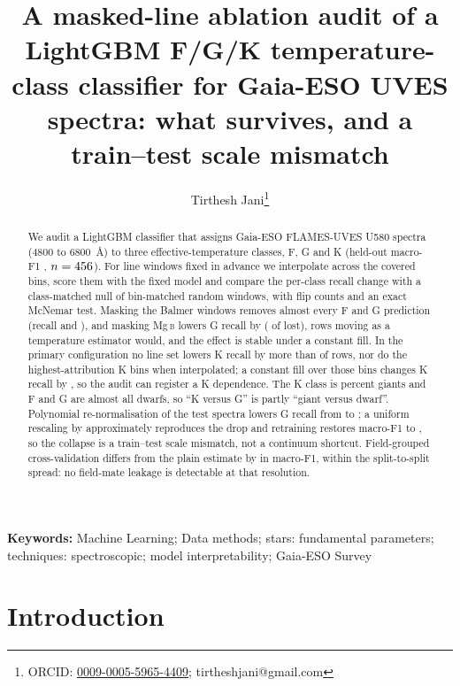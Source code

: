 \documentclass[11pt,a4paper]{article}
\title{A masked-line ablation audit of a LightGBM F/G/K temperature-class classifier for Gaia-ESO UVES spectra: what survives, and a train--test scale mismatch}
\author[1]{Tirthesh Jani\thanks{ORCID: \href{https://orcid.org/0009-0005-5965-4409}{0009-0005-5965-4409}; tirtheshjani@gmail.com}}
\affil[1]{Department of Computer Science, Lakehead University, 5 Ross Street, Barrie, ON L4M 3A5, Canada}
\date{}  %
\newcommand{\Mgb}{Mg\,\textsc{b}\xspace}
\begin{document}
\maketitle

\begin{abstract}
\noindent We audit a LightGBM classifier that assigns Gaia-ESO FLAMES-UVES U580 spectra (4800 to 6800~\AA) to three effective-temperature classes, F, G and K (held-out macro-F1 \testMacroF, $n = 456$). For line windows fixed in advance we interpolate across the covered bins, score them with the fixed model and compare the per-class recall change with a class-matched null of \ablNControls{} bin-matched random windows, with flip counts and an exact McNemar test. Masking the Balmer windows removes almost every F and G prediction (recall \ablPrimHbFDelta{} and \ablPrimHbGDelta), and masking \Mgb lowers G recall by \ablPrimMgGDelta{} (\ablPrimMgGLost{} of \ablPrimMgGN{} lost), rows moving as a temperature estimator would, and the effect is stable under a constant fill. In the primary configuration no line set lowers K recall by more than \ablKMaxLost{} of \nClassK{} rows, nor do the \pcBinsTopHundred{} highest-attribution K bins when interpolated; a constant fill over those bins changes K recall by \pcConstTopHundredKDelta, so the audit can register a K dependence. The K class is \lumGiantPctK{} percent giants and F and G are almost all dwarfs, so ``K versus G'' is partly ``giant versus dwarf''. Polynomial re-normalisation of the test spectra lowers G recall from \sdProdRecG{} to \sdPolyRecG; a uniform rescaling by \sdUniMult{} approximately reproduces the drop and retraining restores macro-F1 to \rtPolyMacroF, so the collapse is a train--test scale mismatch, not a continuum shortcut. Field-grouped cross-validation differs from the plain estimate by \cvFldGapPlain{} in macro-F1, within the \cvGap{} split-to-split spread: no field-mate leakage is detectable at that resolution.
\end{abstract}

\noindent \textbf{Keywords:} Machine Learning; Data methods; stars: fundamental parameters; techniques: spectroscopic; model interpretability; Gaia-ESO Survey

\section{Introduction}
\label{sec:intro}
\end{document}
